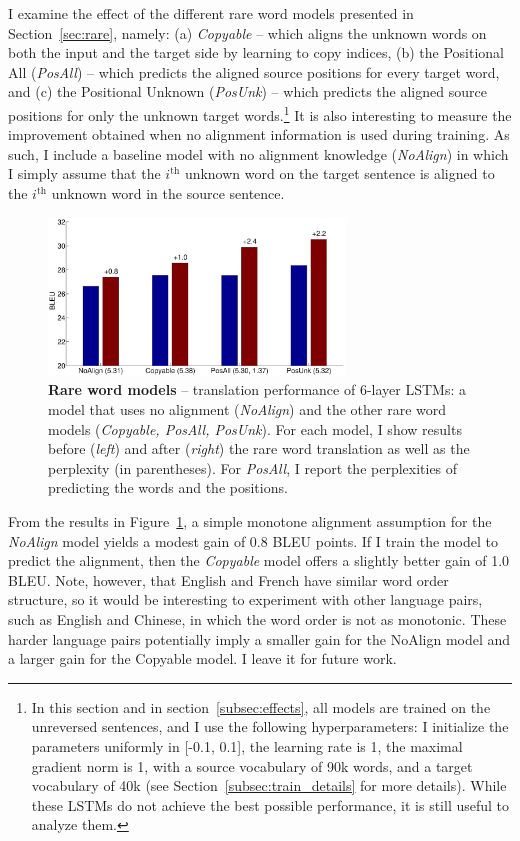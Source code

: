 I examine the effect of the different rare word models presented in
Section~\ref{sec:rare}, namely: (a) {\it Copyable} -- which aligns the unknown
words on both the input and the target side by learning to copy indices, (b) the Positional All
({\it PosAll}) -- which predicts the aligned source positions for every target
word, and (c) the Positional Unknown ({\it PosUnk}) -- which predicts the aligned
source positions for only the unknown target words.\footnote{In this section and in section~\ref{subsec:effects},
all models are trained on the unreversed sentences, and I use the following hyperparameters: 
I initialize the parameters uniformly in [-0.1, 0.1], the learning rate is 1, the maximal gradient norm is 1, 
with a source vocabulary of 90k words, and a target vocabulary of 40k (see Section~\ref{subsec:train_details} for more details).
While these LSTMs do not achieve the best possible performance, it is still useful to analyze them.}
It is also interesting to measure the improvement obtained when no alignment information is used during training.
As such, I include a baseline model with no alignment knowledge ({\it NoAlign}) in which I simply assume that the $i^{\textrm{th}}$ unknown word on the target
sentence is aligned to the $i^{\textrm{th}}$ unknown word in the source sentence.

\begin{figure}
\centering
\includegraphics[width=0.7\textwidth, clip=true, trim= 105 0 140 0]{img/3-compare} %
\caption[Rare word models]{{\bf Rare word models} -- 
translation performance of 6-layer LSTMs:
a model that uses no alignment ({\it NoAlign}) 
and the other rare word models ({\it Copyable, PosAll, PosUnk}). 
For each model, I show results before ({\it left}) and after ({\it right}) the rare word translation as well as the perplexity (in parentheses).
For {\it PosAll}, I report the perplexities of predicting the words and the positions.} 
\label{f:compare}
\end{figure}

 
From the results in Figure~\ref{f:compare}, a simple monotone
alignment assumption for the {\it NoAlign} model yields a modest gain of
0.8 BLEU points. If I train the model to predict the alignment, then the {\it Copyable} model
offers a slightly better gain of 1.0 BLEU. Note, however, that English
and French have similar word order structure, so it would be
interesting to experiment with other language pairs, such as English and
Chinese, in which the word order is not as monotonic. These harder language pairs 
potentially imply a smaller gain for the NoAlign model and a larger
gain for the Copyable model. 
I leave it for future work.

